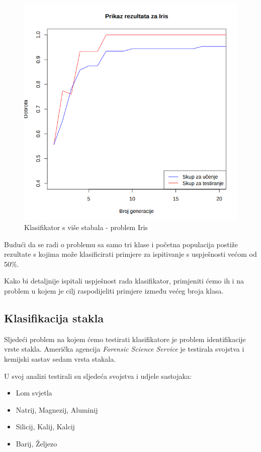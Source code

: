 \documentclass[times, utf8, zavrsni]{fer}
\begin{document}
 
\begin{figure}[htb]
\centering
\includegraphics[scale=0.45]{grafovi/iris2}
\caption{Klasifikator s više stabala - problem Iris}
\end{figure}

Budući da se radi o problemu sa samo tri klase i početna populacija postiže rezultate s kojima može klasificirati primjere za ispitivanje s uspješnosti većom od 50\%.

Kako bi detaljnije ispitali uspješnost rada klasifikator, primjeniti ćemo ih i na problem u kojem je cilj raspodijeliti primjere između većeg broja klasa.


\subsection{Klasifikacija stakla}

Sljedeći problem na kojem ćemo testirati klasifikatore je problem identifikacije vrste stakla. Američka agencija \textit{Forensic Science Service} je testirala svojstva i kemijski sastav sedam vrsta stakala.

U svoj analizi testirali su sljedeća svojstva i udjele sastojaka:
\begin{itemize}
\item Lom svjetla
\item Natrij, Magnezij, Aluminij
\item Silicij, Kalij, Kalcij
\item Barij, Željezo

\end{itemize}
\end{document}
